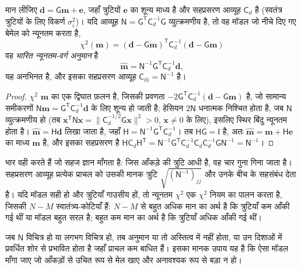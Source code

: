 \begin{theorem}[भारित न्यूनतम-वर्ग अनुमान]\label{thm:b3:seismology-imaging:wls}
मान लीजिए $\mathbf d = \mathsf G\mathbf m + \mathbf e$, जहाँ त्रुटियों $\mathbf e$
का शून्य माध्य है और सहप्रसरण आव्यूह $\mathsf C_d$ है (स्वतंत्र त्रुटियों के लिए
विकर्ण $\sigma_i^2$)। यदि आव्यूह
$\mathsf N = \mathsf G^{\mathsf T}\mathsf C_d^{-1}\mathsf G$ व्युत्क्रमणीय है, तो वह मॉडल
जो नीचे दिए गए बेमेल को न्यूनतम करता है,
\[
  \chi^2(\mathbf m) = (\mathbf d - \mathsf G\mathbf m)^{\mathsf T}\mathsf C_d^{-1}
  (\mathbf d - \mathsf G\mathbf m)
\]
वह \emph{भारित न्यूनतम-वर्ग अनुमान} है
\[
  \hat{\mathbf m} = \mathsf N^{-1}\mathsf G^{\mathsf T}\mathsf C_d^{-1}\mathbf d ,
\]
यह अनभिनत है, और इसका सहप्रसरण आव्यूह
$\mathsf C_{\hat m} = \mathsf N^{-1}$ है।
\end{theorem}

\begin{proof}
$\chi^2$ $\mathbf m$ का एक द्विघात फ़लन है, जिसकी प्रवणता
$-2\mathsf G^{\mathsf T}\mathsf C_d^{-1}(\mathbf d - \mathsf G\mathbf m)$ है, जो
सामान्य समीकरणों $\mathsf N\mathbf m = \mathsf G^{\mathsf T}
\mathsf C_d^{-1}\mathbf d$ के लिए शून्य हो जाती है; हेसियन $2\mathsf N$ धनात्मक निश्चित होता है, जब
$\mathsf N$ व्युत्क्रमणीय हो (तब $\mathbf x^{\mathsf T}\mathsf N\mathbf x =
\|\mathsf C_d^{-1/2}\mathsf G\mathbf x\|^2 > 0$, $\mathbf x \ne 0$ के लिए), इसलिए
स्थिर बिंदु न्यूनतम होता है। $\hat{\mathbf m} = \mathsf H\mathbf d$ लिखा जाता है, जहाँ
$\mathsf H = \mathsf N^{-1}\mathsf G^{\mathsf T}\mathsf C_d^{-1}$। तब
$\mathsf H\mathsf G = \mathsf I$ है, अतः $\hat{\mathbf m} = \mathbf m + \mathsf H\mathbf e$
का माध्य $\mathbf m$ है, और इसका सहप्रसरण है
$\mathsf H\mathsf C_d\mathsf H^{\mathsf T} =
\mathsf N^{-1}\mathsf G^{\mathsf T}\mathsf C_d^{-1}\mathsf C_d\mathsf C_d^{-1}
\mathsf G\mathsf N^{-1} = \mathsf N^{-1}$।
\end{proof}

भार वही करते हैं जो सहज ज्ञान माँगता है: जिस आँकड़े की त्रुटि आधी है, वह
चार गुना गिना जाता है। सहप्रसरण आव्यूह प्रत्येक प्राचल को उसकी मानक त्रुटि
$\sqrt{(\mathsf N^{-1})_{jj}}$ और उनके बीच के सहसंबंध देता है। यदि मॉडल
सही हो और त्रुटियाँ गाउसीय हों, तो न्यूनतम $\chi^2$ एक $\chi^2$ नियम का पालन करता है, जिसकी
$N - M$ स्वातंत्र्य-कोटियाँ हैं: $N - M$ से बहुत अधिक मान का अर्थ है कि त्रुटियाँ
कम आँकी गई थीं या मॉडल बहुत सरल है; बहुत कम मान का अर्थ है कि त्रुटियाँ
अधिक आँकी गई थीं।

जब $\mathsf N$ विचित्र हो या लगभग विचित्र हो, तब अनुमान या तो अस्तित्व में नहीं होता, या
उन दिशाओं में प्रवर्धित शोर से प्रभावित होता है जहाँ प्राचल कम बाधित हैं। इसका
मानक उपाय यह है कि ऐसा मॉडल माँगा जाए जो आँकड़ों से उचित रूप से मेल खाए और
अनावश्यक रूप से बड़ा न हो।

